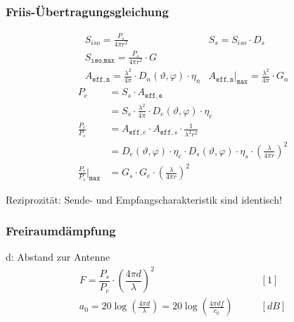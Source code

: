 \subsubsection{Friis-Übertragungsgleichung}
\begin{align*}
	 & S_{iso} = \frac{P_s}{4\pi r^2}                                                       & S_s = S_{iso} \cdot D_s                                                  \\
	 & S_{\texttt{iso,max}}=\frac{P_s}{4\pi r^2}\cdot G                                                                                                                \\
	 & A_{\mathtt{eff,n}} = \frac{\lambda^2}{4\pi}\cdot D_n(\vartheta, \varphi)\cdot \eta_n & A_{\mathtt{eff,n}}\Big|_{\mathtt{max}} = \frac{\lambda^2}{4\pi}\cdot G_n
\end{align*}
\begin{align*}
	P_e                                     & = S_s \cdot A_{\mathtt{eff,e}}                                                                                             \\
	                                        & =  S_s\cdot \frac{\lambda^2}{4\pi}\cdot D_e(\vartheta, \varphi)\cdot \eta_e                                                \\
	\frac{P_{e}}{P_{s}}                     & = A_{\texttt{eff},e}\cdot A_{\texttt{eff},s}\cdot\frac{1}{\lambda^2r^2}                                                    \\
	                                        & = D_e(\vartheta, \varphi)\cdot\eta_{e}\cdot D_s(\vartheta, \varphi)\cdot\eta_{s}\cdot\left(\frac{\lambda}{4\pi r}\right)^2 \\
	\frac{P_{e}}{P_{s}}\Big|_{\mathtt{max}} & = G_{s}\cdot G_{e}\cdot \left(\frac{\lambda}{4\pi r}\right)^2
\end{align*}

Reziprozität: Sende- und Empfangscharakteristik sind identisch!

\subsubsection{Freiraumdämpfung}
d: Abstand zur Antenne
\begin{align*}
	F = \dfrac{P_{s}}{P_{e}} \cdot \left(\dfrac{4 \pi d}{\lambda}\right)^2                             & \qquad [1]       \\
	a_{0} = 20 \log \left(\frac{4 \pi d}{\lambda}\right) =20 \log \left(\frac{4 \pi d f}{c_{0}}\right) & \qquad [\si{dB}]
\end{align*}

